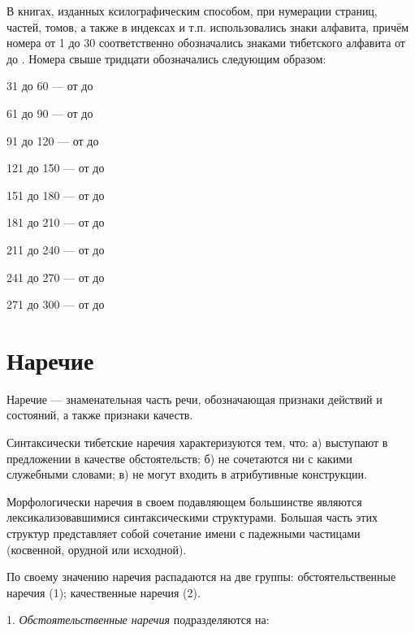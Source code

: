 В книгах, изданных ксилографическим способом, при нумерации страниц, частей, томов, а также в индексах и т.п. использовались знаки алфавита, причём номера от 1 до 30 соответственно обозначались знаками тибетского алфавита от  до . Номера свыше тридцати обозначались следующим образом:
\begin{description}
    \item 31 до 60 --- от  до 
    \item 61 до 90 --- от  до 
    \item 91 до 120 --- от  до 
    \item 121 до 150 --- от  до 
    \item 151 до 180 --- от  до 
    \item 181 до 210 --- от  до 
    \item 211 до 240 --- от  до 
    \item 241 до 270 --- от  до 
    \item 271 до 300 --- от  до 
\end{description}

\section{Наречие}

Наречие --- знаменательная часть речи, обозначающая признаки действий и состояний, а также признаки качеств.

Синтаксически тибетские наречия характеризуются тем, что: а) выступают в предложении в качестве обстоятельств; б) не сочетаются ни с какими служебными словами; в) не могут входить в атрибутивные конструкции.

Морфологически наречия в своем подавляющем большинстве являются лексикализовавшимися синтаксическими структурами. Большая часть этих структур представляет собой сочетание имени с падежными частицами (косвенной, орудной или исходной).

По своему значению наречия распадаются на две группы: обстоятельственные наречия (1); качественные наречия (2).

1. \emph{Обстоятельственные наречия} подразделяются на:

